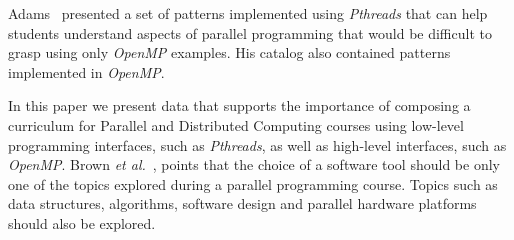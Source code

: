 Adams~\cite{ADAMS201731} presented a set of patterns implemented using
\textit{Pthreads} that can help students understand aspects of parallel
programming that would be difficult to grasp using only \textit{OpenMP}
examples. His catalog also contained patterns implemented in \textit{OpenMP}.

In this paper we present data that supports the importance of composing a
curriculum for Parallel and Distributed Computing courses using low-level
programming interfaces, such as \textit{Pthreads}, as well as high-level
interfaces, such as \textit{OpenMP}.  Brown \textit{et
al.}~\cite{Brown:2010:SPC:1971681.1971689}, points that the choice of a
software tool should be only one of the topics explored during a parallel
programming course. Topics such as data structures, algorithms, software design
and parallel hardware platforms should also be explored.
